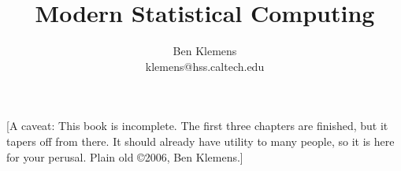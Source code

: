 \documentclass[12pt,notitlepage, openany]{book}
\begin{document}
\setlength{\columnsep}{1.2cm}
\frontmatter
\title{Modern Statistical Computing}
\author{Ben Klemens\\klemens@hss.caltech.edu}
\begin{center}
\fbox{\begin{minipage}{4in}
\maketitle
\end{minipage}}
\end{center}
\thispagestyle{empty}
\vfill
[A caveat: This book is incomplete. The
first three chapters are finished, but it tapers off from there. It should
already have utility to many people, so it is here for your perusal.
Plain old \copyright 2006, Ben Klemens.]
\end{document}
